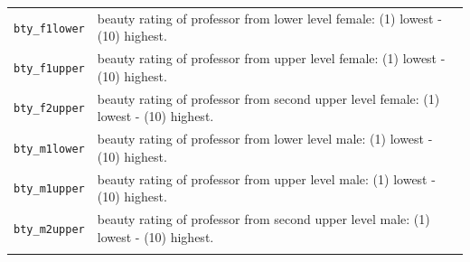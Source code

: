 \documentclass[]{article}
\begin{document}
\begin{longtable}[]{@{}ll@{}}
\begin{minipage}[t]{0.22\columnwidth}
\texttt{bty\_f1lower}\strut
\end{minipage} & \begin{minipage}[t]{0.16\columnwidth}\raggedright\strut
beauty rating of professor from lower level female: (1) lowest - (10)
highest.\strut
\end{minipage}\tabularnewline
\begin{minipage}[t]{0.22\columnwidth}\raggedright\strut
\texttt{bty\_f1upper}\strut
\end{minipage} & \begin{minipage}[t]{0.16\columnwidth}\raggedright\strut
beauty rating of professor from upper level female: (1) lowest - (10)
highest.\strut
\end{minipage}\tabularnewline
\begin{minipage}[t]{0.22\columnwidth}\raggedright\strut
\texttt{bty\_f2upper}\strut
\end{minipage} & \begin{minipage}[t]{0.16\columnwidth}\raggedright\strut
beauty rating of professor from second upper level female: (1) lowest -
(10) highest.\strut
\end{minipage}\tabularnewline
\begin{minipage}[t]{0.22\columnwidth}\raggedright\strut
\texttt{bty\_m1lower}\strut
\end{minipage} & \begin{minipage}[t]{0.16\columnwidth}\raggedright\strut
beauty rating of professor from lower level male: (1) lowest - (10)
highest.\strut
\end{minipage}\tabularnewline
\begin{minipage}[t]{0.22\columnwidth}\raggedright\strut
\texttt{bty\_m1upper}\strut
\end{minipage} & \begin{minipage}[t]{0.16\columnwidth}\raggedright\strut
beauty rating of professor from upper level male: (1) lowest - (10)
highest.\strut
\end{minipage}\tabularnewline
\begin{minipage}[t]{0.22\columnwidth}\raggedright\strut
\texttt{bty\_m2upper}\strut
\end{minipage} & \begin{minipage}[t]{0.16\columnwidth}\raggedright\strut
beauty rating of professor from second upper level male: (1) lowest -
(10) highest.\strut
\end{minipage}\tabularnewline
\begin{minipage}[t]{0.22\columnwidth}\raggedright\strut

\end{minipage}
\end{longtable}
\end{document}

